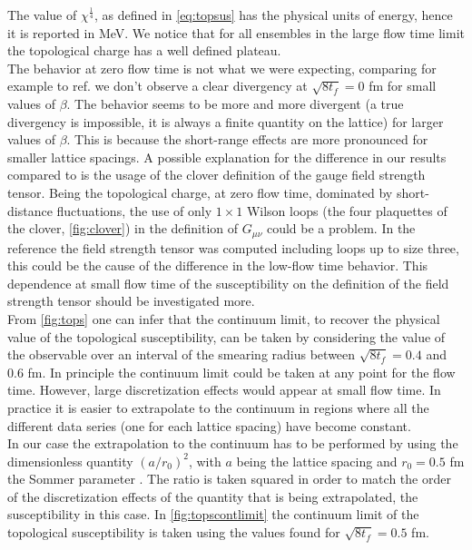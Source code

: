 The value of $\chi^{\frac{1}{4}}$, as defined in \cref{eq:topsus} has the physical units of energy, hence it is reported in MeV. We notice that for all ensembles in the large flow time limit the topological charge has a well defined plateau. \\
The behavior at zero flow time is not what we were expecting, comparing for example to ref. \cite{shindler_nucleon_2015} we don't observe a clear divergency at $\sqrt{8t_f} = 0$ fm for small values of $\beta$. The behavior seems to be more and more divergent (a true divergency is impossible, it is always a finite quantity on the lattice) for larger values of $\beta$. This is because the short-range effects are more pronounced for smaller lattice spacings. A possible explanation for the difference in our results compared to \cite{shindler_nucleon_2015} is the usage of the clover definition of the gauge field strength tensor. Being the topological charge, at zero flow time, dominated by short-distance fluctuations, the use of only $1\times1$ Wilson loops (the four plaquettes of the clover, \cref{fig:clover}) in the definition of $G_{\mu\nu}$ could be a problem. In the reference \cite{shindler_nucleon_2015} the field strength tensor was computed including loops up to size three, this could be the cause of the difference in the low-flow time behavior. This dependence at small flow time of the susceptibility on the definition of the field strength tensor should be investigated more. \\
From \cref{fig:tops} one can infer that the continuum limit, to recover the physical value of the topological susceptibility, can be taken by considering the value of the observable over an interval of the smearing radius between  $\sqrt{8t_f} = 0.4$ and $0.6$ fm. In principle the continuum limit could be taken at any point for the flow time. However, large discretization effects would appear at small flow time. In practice it is easier to extrapolate to the continuum in regions where all the different data series (one for each lattice spacing) have become constant. \\
In our case the extrapolation to the continuum has to be performed by using the dimensionless quantity $(a/r_0)^2$, with $a$ being the lattice spacing and $r_0 = 0.5$ fm the Sommer parameter \cite{guagnelli_precision_1998}. The ratio is taken squared in order to match the order of the discretization effects of the quantity that is being extrapolated, the susceptibility in this case. In \cref{fig:topscontlimit} the continuum limit of the topological susceptibility is taken using the values found for $\sqrt{8t_f}=0.5$ fm.   

